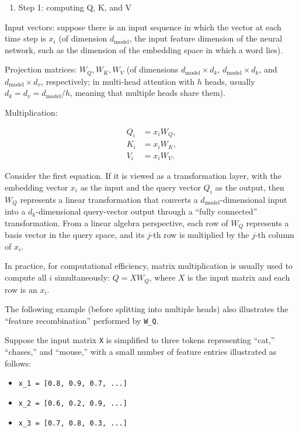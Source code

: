 \begin{enumerate}
\def\labelenumi{\arabic{enumi}.}
\tightlist
\item
  Step 1: computing Q, K, and V
\end{enumerate}

Input vectors: suppose there is an input sequence in which the vector at each time step is \(x_i\) (of dimension \(d_{\mathrm{model}}\), the input feature dimension of the neural network, such as the dimension of the embedding space in which a word lies).

Projection matrices: \(W_Q,W_K,W_V\) (of dimensions \(d_{\mathrm{model}}\times d_k\), \(d_{\mathrm{model}}\times d_k\), and \(d_{\mathrm{model}}\times d_v\), respectively; in multi-head attention with \(h\) heads, usually \(d_k=d_v=d_{\mathrm{model}}/h\), meaning that multiple heads share them).

Multiplication:

\[
\begin{aligned}
Q_i &= x_i W_Q,\\
K_i &= x_i W_K,\\
V_i &= x_i W_V.
\end{aligned}
\]

Consider the first equation. If it is viewed as a transformation layer, with the embedding vector \(x_i\) as the input and the query vector \(Q_i\) as the output, then \(W_Q\) represents a linear transformation that converts a \(d_{\mathrm{model}}\)-dimensional input into a \(d_k\)-dimensional query-vector output through a ``fully connected'' transformation. From a linear algebra perspective, each row of \(W_Q\) represents a basis vector in the query space, and its \(j\)-th row is multiplied by the \(j\)-th column of \(x_i\).

In practice, for computational efficiency, matrix multiplication is usually used to compute all \(i\) simultaneously: \(Q=XW_Q\), where \(X\) is the input matrix and each row is an \(x_i\).

The following example (before splitting into multiple heads) also illustrates the ``feature recombination'' performed by \texttt{W\_Q}.

Suppose the input matrix \texttt{X} is simplified to three tokens representing ``cat,'' ``chases,'' and ``mouse,'' with a small number of feature entries illustrated as follows:

\begin{itemize}
\tightlist
\item
  \texttt{x\_1\ =\ {[}0.8,\ 0.9,\ 0.7,\ ...{]}}
\item
  \texttt{x\_2\ =\ {[}0.6,\ 0.2,\ 0.9,\ ...{]}}
\item
  \texttt{x\_3\ =\ {[}0.7,\ 0.8,\ 0.3,\ ...{]}}
\end{itemize}

